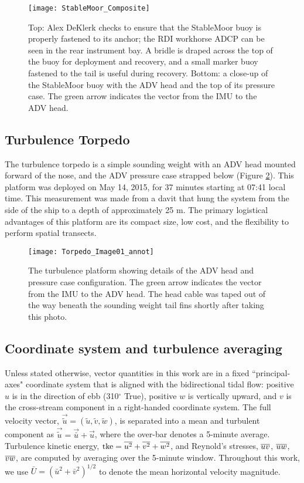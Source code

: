 \begin{figure}[t]
  \centering
  \texttt{[image: StableMoor\_Composite]}
  \caption{Top: Alex DeKlerk checks to ensure that the StableMoor buoy is properly fastened to its anchor; the RDI workhorse ADCP can be seen in the rear instrument bay. A bridle is draped across the top of the buoy for deployment and recovery, and a small marker buoy fastened to the tail is useful during recovery.  Bottom: a close-up of the StableMoor buoy with the ADV head and the top of its pressure case. The green arrow indicates the vector from the IMU to the ADV head. 
}
  \label{fig:SM}
\end{figure}

\subsection{Turbulence Torpedo}

The turbulence torpedo is a simple sounding weight with an ADV head mounted forward of the nose, and the ADV pressure case strapped below (Figure \ref{fig:torpedo}). This platform was deployed on May 14, 2015, for 37 minutes starting at 07:41 local time.  This measurement was made from a davit that hung the system from the side of the ship to a depth of approximately 25 m. The primary logistical advantages of this platform are its compact size, low cost, and the flexibility to perform spatial transects.  

\begin{figure}[th]
  \centering
  \texttt{[image: Torpedo\_Image01\_annot]}
  \caption{The turbulence platform showing details of the ADV head and pressure case configuration. The green arrow indicates the vector from the IMU to the ADV head. The head cable was taped out of the way beneath the sounding weight tail fins shortly after taking this photo.}
  \label{fig:torpedo}
\end{figure}

\subsection{Coordinate system and turbulence averaging}

Unless stated otherwise, vector quantities in this work are in a fixed ``principal-axes" coordinate system that is aligned with the bidirectional tidal flow: positive $u$ is in the direction of ebb (310$^\circ$ True), positive $w$ is vertically upward, and $v$ is the cross-stream component in a right-handed coordinate system. The full velocity vector, $\vec{\tilde{u}} = (\tilde{u}, \tilde{v}, \tilde{w})$, is separated into a mean and turbulent component as $\vec{\tilde{u}} = \vec{\bar{u}} + \vec{u}$, where the over-bar denotes a 5-minute average. Turbulence kinetic energy, $\mathrm{tke} = \overline{u^2} + \overline{v^2}+\overline{w^2}$, and Reynold's stresses, $\overline{uv}$, $\overline{uw}$, $\overline{vw}$, are computed by averaging over the 5-minute window.  Throughout this work, we use $\bar{U} = (\bar{u}^2+\bar{v}^2)^{1/2}$ to denote the mean horizontal velocity magnitude. 

